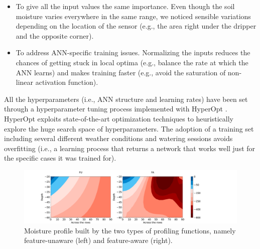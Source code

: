 \begin{itemize}
    \item To give all the input values the same importance. Even though the soil moisture varies everywhere in the same range, we noticed sensible variations depending on the location of the sensor (e.g., the area right under the dripper and the opposite corner).
    \item To address ANN-specific training issues. Normalizing the inputs reduces the chances of getting stuck in local optima (e.g., balance the rate at which the ANN learns) and makes training faster (e.g., avoid the saturation of non-linear activation function).
\end{itemize}

All the hyperparameters (i.e., ANN structure and learning rates) have been set through a hyperparameter tuning process implemented with HyperOpt \citep{bergstra2015hyperopt}. HyperOpt exploits state-of-the-art optimization techniques to heuristically explore the huge search space of hyperparameters. The adoption of a training set including several different weather conditions and watering sessions avoids overfitting (i.e., a learning process that returns a network that works well just for the specific cases it was trained for).


\begin{figure}[t]
\centering
\includegraphics[scale=.25]{chapters/physics-aware/pluto/img/countor_plot.pdf}
\caption{Moisture profile built by the two types of profiling functions, namely feature-unaware (left) and feature-aware (right).}
\label{pluto-fig:FU_FA}
\end{figure}

